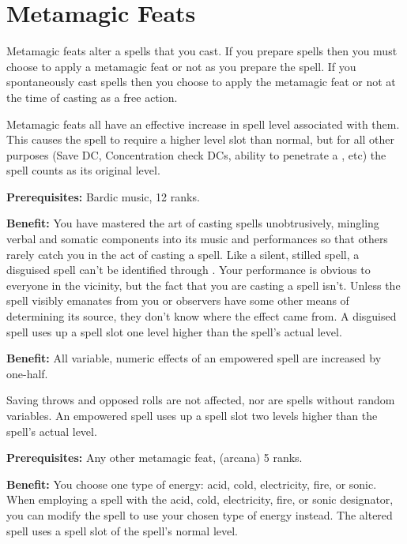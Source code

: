 \section{Metamagic Feats}

Metamagic feats alter a spells that you cast. If you prepare spells then you must choose to apply a metamagic feat or not as you prepare the spell. If you spontaneously cast spells then you choose to apply the metamagic feat or not at the time of casting as a free action.

Metamagic feats all have an effective increase in spell level associated with them. This causes the spell to require a higher level slot than normal, but for all other purposes (Save DC, Concentration check DCs, ability to penetrate a , etc) the spell counts as its original level.


\textbf{Prerequisites:} Bardic music,  12 ranks.

\textbf{Benefit:} You have mastered the art of casting spells unobtrusively, mingling verbal and somatic components into its music and performances so that others rarely catch you in the act of casting a spell. Like a silent, stilled spell, a disguised spell can't be identified through . Your performance is obvious to everyone in the vicinity, but the fact that you are casting a spell isn't. Unless the spell visibly emanates from you or observers have some other means of determining its source, they don't know where the effect came from. A disguised spell uses up a spell slot one level higher than the spell's actual level.


\textbf{Benefit:} All variable, numeric effects of an empowered spell are increased 
by one-half.

Saving throws and opposed rolls are not affected, nor are spells without random 
variables. An empowered spell uses up a spell slot two levels higher than the spell's 
actual level.


\textbf{Prerequisites:} Any other metamagic feat,  (arcana) 5 ranks.

\textbf{Benefit:} You choose one type of energy: acid, cold, electricity, fire, 
or sonic. When employing a spell with the acid, cold, electricity, fire, or sonic 
designator, you can modify the spell to use your chosen type of energy instead. 
The altered spell uses a spell slot of the spell's normal level.

